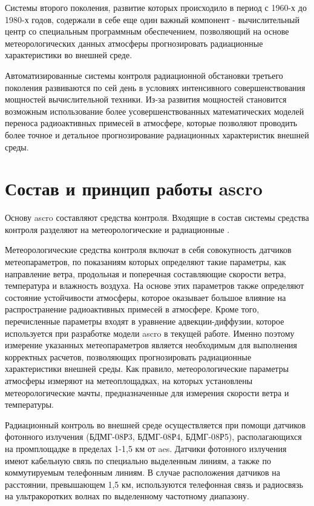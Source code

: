 Системы второго поколения, развитие которых происходило в период с 1960-х до 1980-х годов, содержали в себе еще один 
важный компонент - вычислительный центр со специальным программным обеспечением, позволяющий на основе метеорологических 
данных атмосферы прогнозировать радиационные характеристики во внешней среде. 

Автоматизированные системы контроля радиационной обстановки третьего поколения развиваются по сей день в условиях 
интенсивного совершенствования мощностей вычислительной техники. Из-за развития мощностей становится возможным 
использование более усовершенствованных математических моделей переноса радиоактивных примесей в атмосфере, которые 
позволяют проводить более точное и детальное прогнозирование радиационных характеристик внешней среды.

\section{Состав и принцип работы \ac{ascro}}

Основу \ac{ascro} составляют средства контроля. Входящие в состав системы средства контроля разделяют на 
метеорологические и радиационные \cite{elokhin}.

Метеорологические средства контроля включат в себя совокупность датчиков метеопараметров, по показаниям которых 
определяют такие параметры, как направление ветра, продольная и поперечная составляющие скорости ветра, температура и 
влажность воздуха. На основе этих параметров также определяют состояние устойчивости атмосферы, которое оказывает 
большое влияние на распространение радиоактивных примесей в атмосфере. Кроме того, перечисленные параметры входят в 
уравнение адвекции-диффузии, которое используется при разработке модели \ac{ascro} в текущей работе. Именно поэтому 
измерение указанных метеопараметров является необходимым для выполнения корректных расчетов, позволяющих прогнозировать 
радиационные характеристики внешней среды. Как правило, метеорологические параметры атмосферы измеряют на метеоплощадках, 
на которых установлены метеорологические мачты, предназначенные для измерения скорости ветра и температуры.

Радиационный контроль во внешней среде осуществляется при помощи датчиков фотонного излучения (БДМГ-08Р3, БДМГ-08Р4, 
БДМГ-08Р5), располагающихся на промплощадке в пределах 1-1,5 км от \ac{aes}. Датчики фотонного излучения имеют кабельную 
связь по специально выделенным линиям, а также по коммутируемым телефонным линиям. В случае расположения датчиков на 
расстоянии, превышающем 1,5 км, используются телефонная связь и радиосвязь на ультракоротких волнах по выделенному 
частотному диапазону.

